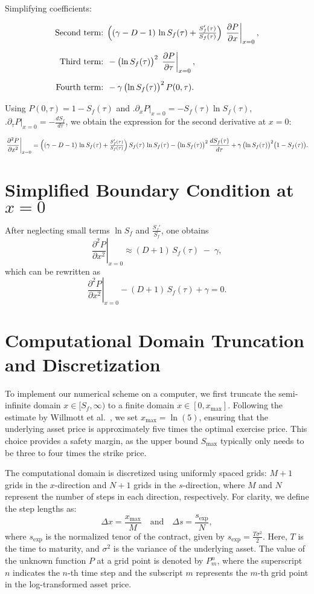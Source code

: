 \documentclass{article}
\begin{document}
Simplifying coefficients:

\begin{align*}
\text{Second term: }
&\Bigl((\gamma - D - 1)\,\ln S_f(\tau) + \tfrac{S_f'(\tau)}{S_f(\tau)}\Bigr)\,
\left.\frac{\partial P}{\partial x}\right|_{x=0}, \\[6pt]
\text{Third term: }
&-\bigl(\ln S_f(\tau)\bigr)^2\,
\left.\frac{\partial P}{\partial \tau}\right|_{x=0}, \\[6pt]
\text{Fourth term: }
&-\gamma\,\bigl(\ln S_f(\tau)\bigr)^2\,P(0,\tau).
\end{align*}

Using \(P(0,\tau)=1 - S_f(\tau)\) and 
\(\bigl.\partial_x P\bigr|_{x=0} = -S_f(\tau)\ln S_f(\tau)\),
\(\bigl.\partial_\tau P\bigr|_{x=0} = -\tfrac{dS_f}{d\tau}\),
we obtain the expression for the second derivative at \(x=0\):

\[
\left.\frac{\partial^2 P}{\partial x^2}\right|_{x=0}
=
\Bigl((\gamma - D - 1)\,\ln S_f(\tau) + \tfrac{S_f'(\tau)}{S_f(\tau)}\Bigr)\,
S_f(\tau)\,\ln S_f(\tau)
-
\bigl(\ln S_f(\tau)\bigr)^2\,\frac{dS_f(\tau)}{d\tau}
+
\gamma\,\bigl(\ln S_f(\tau)\bigr)^2\bigl(1 - S_f(\tau)\bigr).
\]
\section*{Simplified Boundary Condition at \(x=0\)}

After neglecting small terms \(\ln S_f\) and \(\tfrac{S_f'}{S_f}\), one obtains
\[
\left.\frac{\partial^2 P}{\partial x^2}\right|_{x=0}
\approx
(D + 1)\,S_f(\tau)\;-\;\gamma,
\]
which can be rewritten as
\[
\left.\frac{\partial^2 P}{\partial x^2}\right|_{x=0}
- (D + 1)\,S_f(\tau) + \gamma = 0.
\]
\section{Computational Domain Truncation and Discretization}

To implement our numerical scheme on a computer, we first truncate the semi-infinite domain $x \in [S_f, \infty)$ to a finite domain $x \in [0, x_{\text{max}}]$. Following the estimate by Willmott et al.~\cite{Willmott}, we set $x_{\text{max}} = \ln(5)$, ensuring that the underlying asset price is approximately five times the optimal exercise price. This choice provides a safety margin, as the upper bound $S_{\text{max}}$ typically only needs to be three to four times the strike price.

The computational domain is discretized using uniformly spaced grids: $M+1$ grids in the $x$-direction and $N+1$ grids in the $s$-direction, where $M$ and $N$ represent the number of steps in each direction, respectively. For clarity, we define the step lengths as:
\[
\Delta x = \frac{x_{\text{max}}}{M} \quad \text{and} \quad \Delta s = \frac{s_{\text{exp}}}{N},
\]
where $s_{\text{exp}}$ is the normalized tenor of the contract, given by $s_{\text{exp}} = \frac{T \sigma^2}{2}$. Here, $T$ is the time to maturity, and $\sigma^2$ is the variance of the underlying asset. The value of the unknown function $P$ at a grid point is denoted by $P^n_m$, where the superscript $n$ indicates the $n$-th time step and the subscript $m$ represents the $m$-th grid point in the log-transformed asset price.
\end{document}
